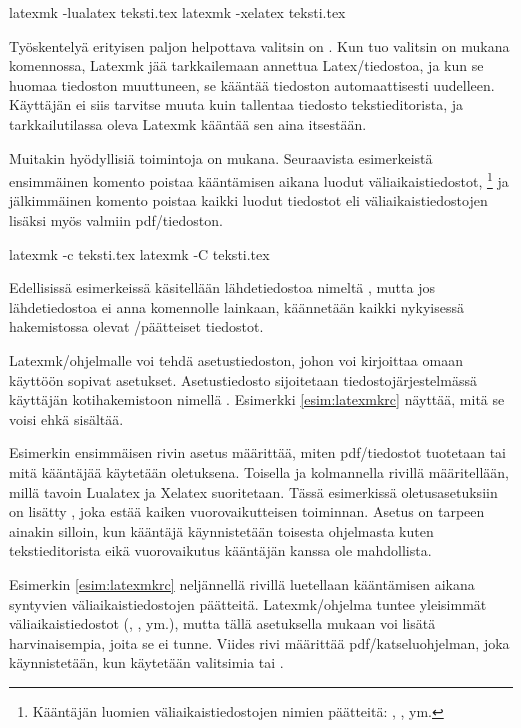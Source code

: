 \begin{koodilohkosis}
  latexmk -lualatex teksti.tex
  latexmk -xelatex  teksti.tex
\end{koodilohkosis}

Työskentelyä erityisen paljon helpottava valitsin on . Kun
tuo valitsin on mukana komennossa, Latexmk jää tarkkailemaan annettua
Latex\-/tiedostoa, ja kun se huomaa tiedoston muuttuneen, se kääntää
tiedoston automaattisesti uudelleen. Käyttäjän ei siis tarvitse muuta
kuin tallentaa tiedosto tekstieditorista, ja tarkkailutilassa oleva
Latexmk kääntää sen aina itsestään.

Muitakin hyödyllisiä toimintoja on mukana. Seuraavista esimerkeistä
ensimmäinen komento poistaa kääntämisen aikana luodut
väliaikaistiedostot,%
\footnote{Kääntäjän luomien väliaikaistiedostojen nimien päätteitä:
  , ,  ym.} ja jälkimmäinen komento
poistaa kaikki luodut tiedostot eli väliaikaistiedostojen lisäksi myös
valmiin pdf\-/tiedoston.

\begin{koodilohkosis}
  latexmk -c teksti.tex
  latexmk -C teksti.tex
\end{koodilohkosis}

Edellisissä esimerkeissä käsitellään lähdetiedostoa nimeltä
, mutta jos lähdetiedostoa ei anna komennolle
lainkaan, käännetään kaikki nykyisessä hakemistossa olevat
\-/päätteiset tiedostot.

Latexmk\-/ohjelmalle voi tehdä asetustiedoston, johon voi kirjoittaa
omaan käyttöön sopivat asetukset. Asetustiedosto sijoitetaan
tiedostojärjestelmässä käyttäjän kotihakemistoon nimellä
. Esimerkki \ref{esim:latexmkrc} näyttää, mitä se
voisi ehkä sisältää.

Esimerkin ensimmäisen rivin asetus määrittää, miten pdf\-/tiedostot
tuotetaan tai mitä kääntäjää käytetään oletuksena. Toisella ja
kolmannella rivillä määritellään, millä tavoin Lualatex ja Xelatex
suoritetaan. Tässä esimerkissä ole\-tus\-ase\-tuk\-siin on lisätty
, joka estää kaiken vuorovaikutteisen toiminnan.
Asetus on tarpeen ainakin silloin, kun kääntäjä käynnistetään toisesta
ohjelmasta kuten tekstieditorista eikä vuorovaikutus kääntäjän kanssa
ole mahdollista.



Esimerkin \ref{esim:latexmkrc} neljännellä rivillä luetellaan
kääntämisen aikana syntyvien väliaikaistiedostojen päätteitä.
Latexmk\-/ohjelma tuntee yleisimmät väliaikaistiedostot (,
,  ym.), mutta tällä asetuksella mukaan voi lisätä
harvinaisempia, joita se ei tunne. Viides rivi määrittää
pdf\-/katseluohjelman, joka käynnistetään, kun käytetään valitsimia
 tai .

